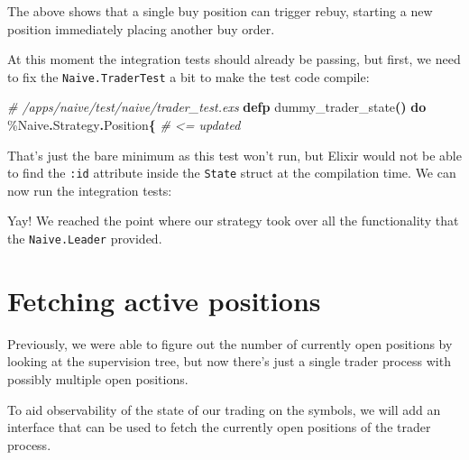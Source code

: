 \documentclass[
  oneside]{book}
\newenvironment{Shaded}{\begin{snugshade}}{\end{snugshade}}
\newcommand{\CommentTok}[1]{\textcolor[rgb]{0.56,0.35,0.01}{\textit{#1}}}
\newcommand{\ConstantTok}[1]{\textcolor[rgb]{0.56,0.35,0.01}{#1}}
\newcommand{\ErrorTok}[1]{\textcolor[rgb]{0.64,0.00,0.00}{\textbf{#1}}}
\newcommand{\ExtensionTok}[1]{#1}
\newcommand{\FunctionTok}[1]{\textcolor[rgb]{0.13,0.29,0.53}{\textbf{#1}}}
\newcommand{\KeywordTok}[1]{\textcolor[rgb]{0.13,0.29,0.53}{\textbf{#1}}}
\newcommand{\NormalTok}[1]{#1}
\newcommand{\OperatorTok}[1]{\textcolor[rgb]{0.81,0.36,0.00}{\textbf{#1}}}
\begin{document}
The above shows that a single buy position can trigger rebuy, starting a new position immediately placing another buy order.

At this moment the integration tests should already be passing, but first, we need to fix the \texttt{Naive.TraderTest} a bit to make the test code compile:

\begin{Shaded}
\begin{Highlighting}[]
  \CommentTok{\# /apps/naive/test/naive/trader\_test.exs}
  \KeywordTok{defp}\NormalTok{ dummy\_trader\_state}\FunctionTok{()} \KeywordTok{do}
\NormalTok{    \%}\ConstantTok{Naive}\OperatorTok{.}\ConstantTok{Strategy}\OperatorTok{.}\ConstantTok{Position}\FunctionTok{\{} \CommentTok{\# \textless{}= updated}
\end{Highlighting}
\end{Shaded}

That's just the bare minimum as this test won't run, but Elixir would not be able to find the \texttt{:id} attribute inside the \texttt{State} struct at the compilation time. We can now run the integration tests:

\begin{Shaded}
\end{Shaded}

Yay! We reached the point where our strategy took over all the functionality that the \texttt{Naive.Leader} provided.

\section{Fetching active positions}\label{fetching-active-positions}

Previously, we were able to figure out the number of currently open positions by looking at the supervision tree, but now there's just a single trader process with possibly multiple open positions.

To aid observability of the state of our trading on the symbols, we will add an interface that can be used to fetch the currently open positions of the trader process.
\end{document}
